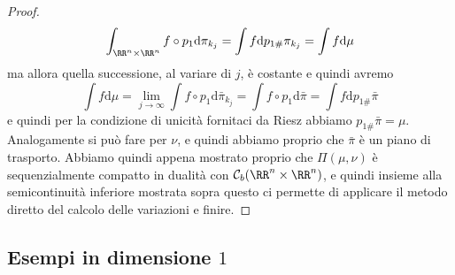 \documentclass[11pt]{scrartcl}
\newcommand{\dif}{\text{d}}
\begin{document}
\begin{proof}
		$$\int_{\RR^n\times\RR^n}f\circ p_1\dif \pi_{k_j}=\int f \dif p_{1\#}\pi_{k_j}=\int f \dif \mu$$
		ma allora quella successione, al variare di $j$, è costante e quindi avremo
		$$\int f \dif \mu=\lim_{j\to\infty}\int f\circ p_1\dif \bar\pi_{k_j}=\int f\circ p_1\dif \bar{\pi}=\int f\dif  p_{1\#}\bar{\pi}$$
		e quindi per la condizione di unicità fornitaci da Riesz abbiamo $p_{1\#}\bar{\pi}=\mu$. Analogamente si può fare per $\nu$, e quindi abbiamo proprio che $\bar{\pi}$ è un piano di trasporto. Abbiamo quindi appena mostrato proprio che $\Pi(\mu,\nu)$ è sequenzialmente compatto in dualità con $\mathcal{C}_b(\RR^n\times\RR^n)$, e quindi insieme alla semicontinuità inferiore mostrata sopra questo ci permette di applicare il metodo diretto del calcolo delle variazioni e finire. 
	\end{proof}
	
	\subsection{Esempi in dimensione $1$}
	
\end{document}

